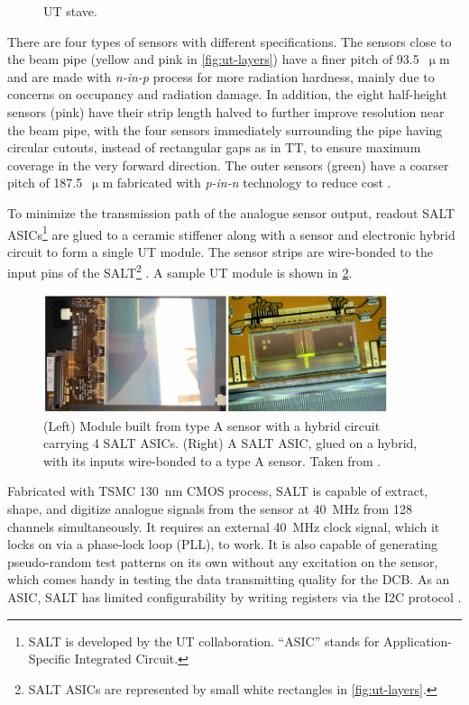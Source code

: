 \begin{figure}[!htb]
    \caption{
        UT stave.
    }
    \label{fig:stave}
\end{figure}

There are four types of sensors with different specifications.
The sensors close to the beam pipe (yellow and pink in \cref{fig:ut-layers})
have a finer pitch of 93.5~$\upmu$m and are made with \emph{n-in-p} process for
more radiation hardness,
mainly due to concerns on occupancy and radiation damage.
In addition, the eight half-height sensors (pink) have their strip length halved
to further improve resolution near the beam pipe,
with the four sensors immediately surrounding the pipe having
circular cutouts, instead of rectangular gaps as in TT, to ensure maximum
coverage in the very forward direction.
The outer sensors (green) have a coarser pitch of 187.5~$\upmu$m fabricated with
\emph{p-in-n} technology to reduce cost
\cite{Carli:2783293}.

To minimize the transmission path of the analogue sensor output, readout
SALT ASICs\footnote{
    SALT is developed by the UT collaboration.
    ``ASIC'' stands for Application-Specific Integrated Circuit.
} are glued to a ceramic stiffener along with a sensor and electronic hybrid
circuit to form a single UT module.
The sensor strips are wire-bonded to the input pins of the SALT\footnote{
    SALT ASICs are represented by small white rectangles in
    \cref{fig:ut-layers}.
}
\cite{Wang:2015mem}.
A sample UT module is shown in \cref{fig:ut-module}.

\begin{figure}[!htb]
    \centering
    \includegraphics[width=0.9\textwidth]{./figs-ut-upgrade/stave/ut_sensor_module.pdf}
    \caption{
        (Left) Module built from type A sensor with a hybrid circuit carrying
        4 SALT ASICs.
        (Right) A SALT ASIC, glued on a hybrid, with its inputs wire-bonded
        to a type A sensor.
        Taken from \cite{Carli:2783293}.
    }
    \label{fig:ut-module}
\end{figure}

Fabricated with TSMC 130~nm CMOS process, SALT is capable of extract, shape,
and digitize analogue signals from the sensor at 40~MHz from 128 channels
simultaneously.
It requires an external 40~MHz clock signal,
which it locks on via a phase-lock loop (PLL),
to work.
It is also capable of generating pseudo-random test patterns on its own without
any excitation on the sensor, which comes handy in testing the data transmitting
quality for the DCB.
As an ASIC, SALT has limited configurability by writing registers via the I2C
protocol \cite{s22010107}.


